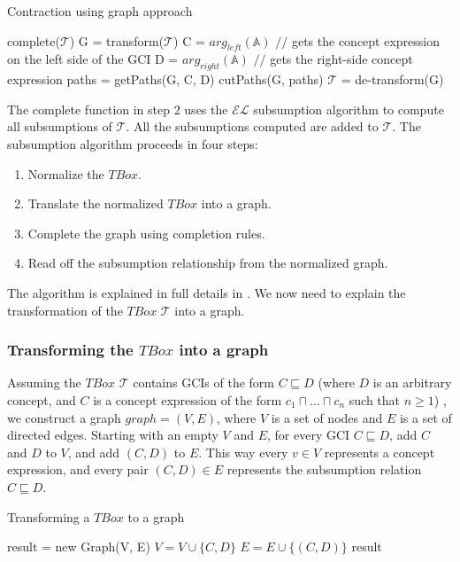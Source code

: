 \begin{algorithm}
\caption{Contraction using graph approach}
\label{GraphContract}
\begin{algorithmic}[1]
\State complete($ \mathcal{T} $)
\State G = transform($ \mathcal{T} $)
\State C = $arg_{left}(\mathbb{A})$ $//$ gets the concept expression on the left side of the GCI
\State D = $arg_{right}(\mathbb{A})$ $//$ gets the right-side concept expression
\State paths = getPaths(G, C, D)
\State cutPaths(G, paths)
\State $ \mathcal{T} $ = de-transform(G)
\EndFunction
\end{algorithmic}
\end{algorithm}

The complete function in step 2 uses the $\mathcal{EL}$ subsumption algorithm to compute all subsumptions of $\mathcal{T}$. All the subsumptions computed are added to $\mathcal{T}$. The subsumption algorithm proceeds in four steps:\cite{new}
\begin{enumerate}
\item Normalize the $TBox$.
\item Translate the normalized $TBox$ into a graph.
\item Complete the graph using completion rules.
\item Read off the subsumption relationship from the normalized graph.
\end{enumerate}
The algorithm is explained in full details in \cite{new}. We now need to explain the transformation of the $TBox$ $\mathcal{T}$ into a graph.

\subsubsection{Transforming the $TBox$ into a graph}
Assuming the $TBox$ $\mathcal{T}$ contains GCIs of the form $C \sqsubseteq D$ (where $D$ is an arbitrary concept, and $C$ is a concept expression of the form $c_1 \sqcap ... \sqcap c_n$ such that $n \geq 1$) , we construct a graph $graph=(V, E)$, where $V$ is a set of nodes and $E$ is a set of directed edges. Starting with an empty $V$ and $E$, for every GCI $C \sqsubseteq D$, add $C$ and $D$ to $V$, and add $(C, D)$ to $E$. This way every $v \in V$ represents a concept expression, and every pair $(C, D) \in E$ represents the subsumption relation $C \sqsubseteq D$.

\begin{algorithm}
\caption{Transforming a $TBox$ to a graph}
\label{Transformation}
\begin{algorithmic}[1]
\State result = new Graph(V, E)
\State $V = V \cup \{C, D\}$
\State $E = E \cup \{(C, D)\}$
\EndFor
\State \Return result
\EndFunction
\end{algorithmic}
\end{algorithm}

